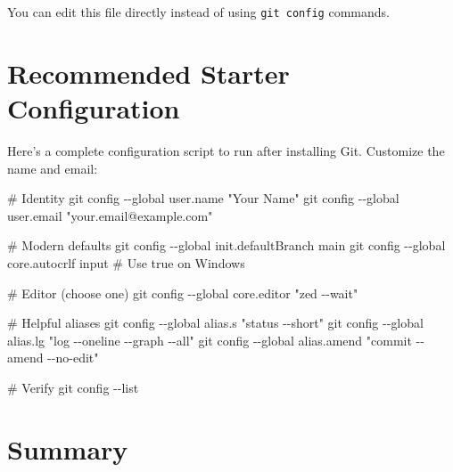 \documentclass[
  letterpaper,
  DIV=11,
  numbers=noendperiod]{scrreprt}
\newenvironment{Shaded}{\begin{snugshade}}{\end{snugshade}}
\newcommand{\AttributeTok}[1]{\textcolor[rgb]{0.40,0.45,0.13}{#1}}
\newcommand{\CommentTok}[1]{\textcolor[rgb]{0.37,0.37,0.37}{#1}}
\newcommand{\FunctionTok}[1]{\textcolor[rgb]{0.28,0.35,0.67}{#1}}
\newcommand{\NormalTok}[1]{\textcolor[rgb]{0.00,0.23,0.31}{#1}}
\newcommand{\StringTok}[1]{\textcolor[rgb]{0.13,0.47,0.30}{#1}}
\begin{document}
You can edit this file directly instead of using \texttt{git\ config}
commands.

\section{Recommended Starter
Configuration}\label{recommended-starter-configuration}

Here's a complete configuration script to run after installing Git.
Customize the name and email:

\begin{codelisting}

\caption{\texttt{terminal}}

\begin{Shaded}
\begin{Highlighting}[]
\CommentTok{\# Identity}
\FunctionTok{git}\NormalTok{ config }\AttributeTok{{-}{-}global}\NormalTok{ user.name }\StringTok{"Your Name"}
\FunctionTok{git}\NormalTok{ config }\AttributeTok{{-}{-}global}\NormalTok{ user.email }\StringTok{"your.email@example.com"}

\CommentTok{\# Modern defaults}
\FunctionTok{git}\NormalTok{ config }\AttributeTok{{-}{-}global}\NormalTok{ init.defaultBranch main}
\FunctionTok{git}\NormalTok{ config }\AttributeTok{{-}{-}global}\NormalTok{ core.autocrlf input  }\CommentTok{\# Use \textquotesingle{}true\textquotesingle{} on Windows}

\CommentTok{\# Editor (choose one)}
\FunctionTok{git}\NormalTok{ config }\AttributeTok{{-}{-}global}\NormalTok{ core.editor }\StringTok{"zed {-}{-}wait"}

\CommentTok{\# Helpful aliases}
\FunctionTok{git}\NormalTok{ config }\AttributeTok{{-}{-}global}\NormalTok{ alias.s }\StringTok{"status {-}{-}short"}
\FunctionTok{git}\NormalTok{ config }\AttributeTok{{-}{-}global}\NormalTok{ alias.lg }\StringTok{"log {-}{-}oneline {-}{-}graph {-}{-}all"}
\FunctionTok{git}\NormalTok{ config }\AttributeTok{{-}{-}global}\NormalTok{ alias.amend }\StringTok{"commit {-}{-}amend {-}{-}no{-}edit"}

\CommentTok{\# Verify}
\FunctionTok{git}\NormalTok{ config }\AttributeTok{{-}{-}list}
\end{Highlighting}
\end{Shaded}

\end{codelisting}

\section{Summary}\label{summary-10}
\end{document}
